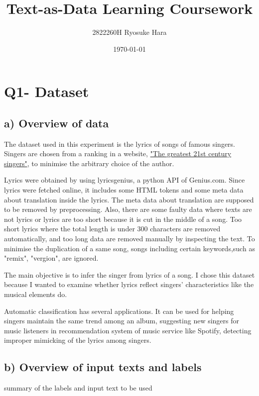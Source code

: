 \documentclass[a4paper,11pt]{article}
\begin{document}
\title{Text-as-Data Learning Coursework}
\author{2822260H Ryosuke Hara}
\date{\today}
\maketitle

\section{Q1- Dataset}
\subsection{a) Overview of data}%
The dataset used in this experiment is the lyrics of songs of famous singers.
Singers are chosen from a ranking in a website, \href{https://www.thefamouspeople.com/21st-century-singers.php}{"The greatest 21st century singers"}, to minimise the arbitrary choice of the author.

Lyrics were obtained by using lyricsgenius, a python API of Genius.com.
Since lyrics were fetched online, it includes some HTML tokens and some meta data about translation inside the lyrics.
The meta data about translation are supposed to be removed by preprocessing.
Also, there are some faulty data where texts are not lyrics or lyrics are too short because it is cut in the middle of a song.
Too short lyrics where the total length is under 300 characters are removed automatically, and too long data are removed manually by inspecting the text.
To minimise the duplication of a same song, songs including certain keywords,such as "remix", "vergion", are ignored.


The main objective is to infer the singer from lyrics of a song.
I chose this dataset because I wanted to examine whether lyrics reflect singers' characteristics like the musical elements do.

Automatic classification has several applications.
It can be used for helping singers maintain the same trend among an album,
suggesting new singers for music listeners in recommendation system of music service like Spotify, 
detecting improper mimicking of the lyrics among singers. 

\subsection{b) Overview of input texts and labels}
summary of the labels and input text to be used \\
\end{document}

